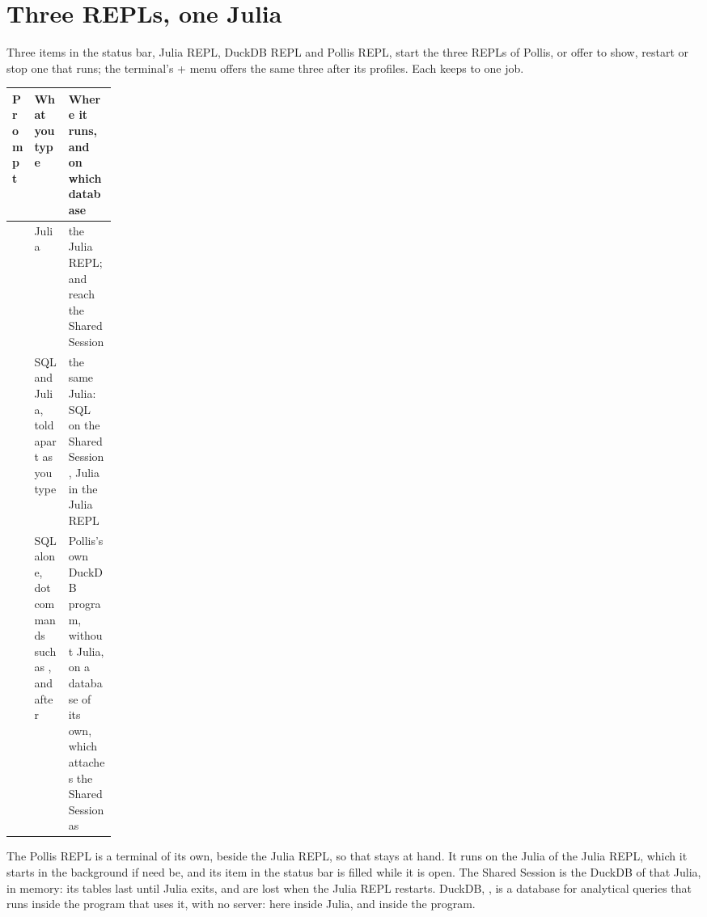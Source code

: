 \tableofcontents

\section{Three REPLs, one Julia}\label{sec:three}
Three items in the status bar, Julia REPL, DuckDB REPL and Pollis REPL, start the three REPLs of Pollis, or offer to
show, restart or stop one that runs;
the terminal's + menu offers the same three after its profiles. Each keeps to one job.

\begin{center}\small
\renewcommand{\arraystretch}{1.25}
\begin{tabularx}{\linewidth}{@{}p{0.15\linewidth}LL@{}}
\toprule
\textbf{Prompt} & \textbf{What you type} & \textbf{Where it runs, and on which database}\\
\midrule
{} & Julia & the Julia REPL;  and  reach the Shared Session\\
 & SQL and Julia, told apart as you type & the same Julia: SQL on the Shared Session, Julia in the
  Julia REPL\\
 & SQL alone, dot commands such as , and  after  & Pollis's own DuckDB program, without Julia, on a
  database of its own, which attaches the Shared Session as \\
\bottomrule
\end{tabularx}
\end{center}
The Pollis REPL is a terminal of its own, beside the Julia REPL, so that  stays at hand. It runs on the
Julia of the Julia REPL, which it starts in the background if need be, and its item in the status bar is filled while
it is open. The Shared Session is the DuckDB of that Julia, in memory: its tables last until Julia exits, and are lost
when the Julia REPL restarts. DuckDB, , is a database for analytical
queries that runs inside the program that uses it, with no server: here inside Julia, and inside the 
program.

